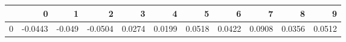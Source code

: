 \begin{tabular}{lrrrrrrrrrr}
\toprule
{} &       0 &      1 &       2 &       3 &       4 &       5 &       6 &       7 &       8 &       9 \\
\midrule
0 & -0.0443 & -0.049 & -0.0504 &  0.0274 &  0.0199 &  0.0518 &  0.0422 &  0.0908 &  0.0356 &  0.0512 \\
\bottomrule
\end{tabular}
